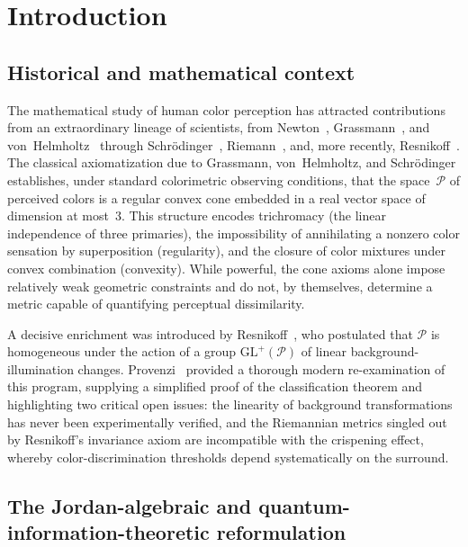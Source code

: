 \documentclass[11pt]{article}
\theoremstyle{plain}
\theoremstyle{definition}
\theoremstyle{remark}
\begin{document}
\section{Introduction}
\label{sec:introduction}

\subsection{Historical and mathematical context}
\label{ssec:historical}

The mathematical study of human color perception has attracted contributions from an extraordinary lineage of scientists, from Newton~\cite{Newton1704}, Grassmann~\cite{Grassmann1853}, and von~Helmholtz~\cite{Helmholtz1924} through Schr\"odinger~\cite{Schrodinger1920}, Riemann~\cite{Riemann1854}, and, more recently, Resnikoff~\cite{Resnikoff1974}.
The classical axiomatization due to Grassmann, von~Helmholtz, and Schr\"odinger establishes, under standard colorimetric observing conditions, that the space~$\mathcal{P}$ of perceived colors is a regular convex cone embedded in a real vector space of dimension at most~$3$.
This structure encodes trichromacy (the linear independence of three primaries), the impossibility of annihilating a nonzero color sensation by superposition (regularity), and the closure of color mixtures under convex combination (convexity).
While powerful, the cone axioms alone impose relatively weak geometric constraints and do not, by themselves, determine a metric capable of quantifying perceptual dissimilarity.

A decisive enrichment was introduced by Resnikoff~\cite{Resnikoff1974}, who postulated that $\mathcal{P}$ is homogeneous under the action of a group $\mathrm{GL}^+(\mathcal{P})$ of linear background-illumination changes.
Provenzi~\cite{Provenzi2020} provided a thorough modern re-examination of this program, supplying a simplified proof of the classification theorem and highlighting two critical open issues: the linearity of background transformations has never been experimentally verified, and the Riemannian metrics singled out by Resnikoff's invariance axiom are incompatible with the crispening effect, whereby color-discrimination thresholds depend systematically on the surround.

\subsection{The Jordan-algebraic and quantum-information-theoretic reformulation}
\label{ssec:jordan}
\end{document}
